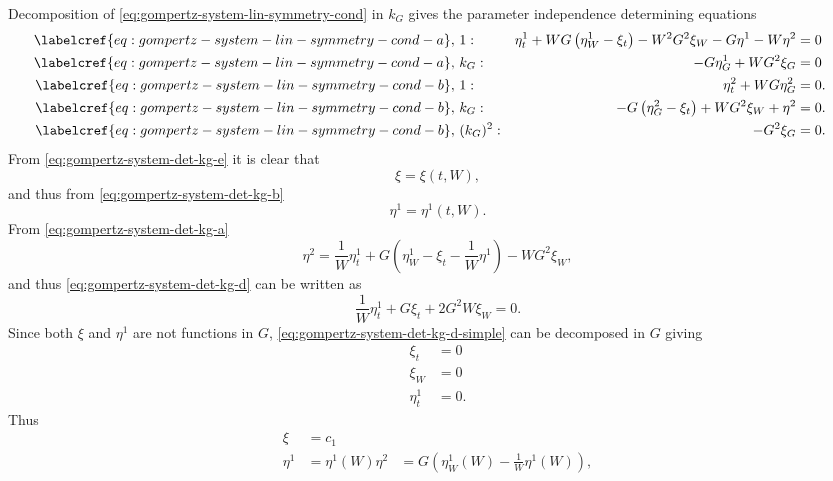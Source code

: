 Decomposition of \cref{eq:gompertz-system-lin-symmetry-cond} in \(k_G\) gives the parameter independence determining equations
\begin{subequations}
  \begin{flalign}
    \labelcref{eq:gompertz-system-lin-symmetry-cond-a},\ & 1 : & \eta^1_t + W G \left(\eta^1_W - \xi_t\right) - W^2 G^2 \xi_W - G \eta^1 - W \eta^2 &= 0 && \FlLabel{eq:gompertz-system-det-kg-a}\\
    \labelcref{eq:gompertz-system-lin-symmetry-cond-a},\ & k_G : & - G \eta^1_G + W G^2 \xi_G &= 0 && \FlLabel{eq:gompertz-system-det-kg-b}\\
    \labelcref{eq:gompertz-system-lin-symmetry-cond-b},\ & 1 : & \eta^2_t + W G \eta^2_G &= 0. && \FlLabel{eq:gompertz-system-det-kg-c} \\
    \labelcref{eq:gompertz-system-lin-symmetry-cond-b},\ & k_G : & - G \left(\eta^2_G - \xi_t\right) + W G^2 \xi_W + \eta^2 &= 0. && \FlLabel{eq:gompertz-system-det-kg-d} \\
    \labelcref{eq:gompertz-system-lin-symmetry-cond-b},\ & (k_G)^2 : & - G^2 \xi_G &= 0. && \FlLabel{eq:gompertz-system-det-kg-e}
  \end{flalign}
\end{subequations}
From \cref{eq:gompertz-system-det-kg-e} it is clear that
\begin{equation}
  \xi = \xi(t, W),
\end{equation}
and thus from \cref{eq:gompertz-system-det-kg-b}
\begin{equation}
  \eta^1 = \eta^1(t, W).
\end{equation}
From \cref{eq:gompertz-system-det-kg-a}
\begin{equation}
  \eta^2 = \frac{1}{W}\eta^1_t + G \left(\eta^1_W - \xi_t - \frac{1}{W} \eta^1 \right) - W G^2 \xi_W,
\end{equation}
and thus \cref{eq:gompertz-system-det-kg-d} can be written as
\begin{equation}\label{eq:gompertz-system-det-kg-d-simple}
  \frac{1}{W}\eta^1_t + G \xi_t + 2 G^2 W \xi_W = 0.
\end{equation}
Since both \(\xi\) and \(\eta^1\) are not functions in \(G\), \cref{eq:gompertz-system-det-kg-d-simple} can be decomposed in \(G\) giving
\begin{align}
  \xi_t &= 0\\
  \xi_W &= 0\\
  \eta^1_t &= 0.
\end{align}
Thus
\begin{align}
  \xi &= c_1\\
  \eta^1 &= \eta^1(W)
  \eta^2 &= G \left(\eta^1_W(W) - \frac{1}{W} \eta^1(W) \right),
\end{align}
